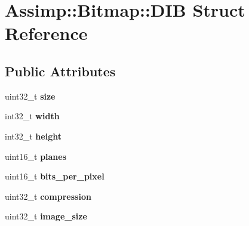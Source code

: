 \hypertarget{struct_assimp_1_1_bitmap_1_1_d_i_b}{\section{Assimp\+:\+:Bitmap\+:\+:D\+I\+B Struct Reference}
\label{struct_assimp_1_1_bitmap_1_1_d_i_b}
}
\subsection*{Public Attributes}
\begin{DoxyCompactItemize}
\item 
\hypertarget{struct_assimp_1_1_bitmap_1_1_d_i_b_a3f900bb044bf5acdb15df11b01d6d1fc}{uint32\+\_\+t {\bfseries size}}\label{struct_assimp_1_1_bitmap_1_1_d_i_b_a3f900bb044bf5acdb15df11b01d6d1fc}

\item 
\hypertarget{struct_assimp_1_1_bitmap_1_1_d_i_b_aaf07cdb2ea0ec2281c658dcf16d11fa1}{int32\+\_\+t {\bfseries width}}\label{struct_assimp_1_1_bitmap_1_1_d_i_b_aaf07cdb2ea0ec2281c658dcf16d11fa1}

\item 
\hypertarget{struct_assimp_1_1_bitmap_1_1_d_i_b_a574c072f98b3b3728ab6d2cd46c9510a}{int32\+\_\+t {\bfseries height}}\label{struct_assimp_1_1_bitmap_1_1_d_i_b_a574c072f98b3b3728ab6d2cd46c9510a}

\item 
\hypertarget{struct_assimp_1_1_bitmap_1_1_d_i_b_a94b97deb6d6cfa4453fd701055fc2c5b}{uint16\+\_\+t {\bfseries planes}}\label{struct_assimp_1_1_bitmap_1_1_d_i_b_a94b97deb6d6cfa4453fd701055fc2c5b}

\item 
\hypertarget{struct_assimp_1_1_bitmap_1_1_d_i_b_afb807e26fa867909098491735d7cbc86}{uint16\+\_\+t {\bfseries bits\+\_\+per\+\_\+pixel}}\label{struct_assimp_1_1_bitmap_1_1_d_i_b_afb807e26fa867909098491735d7cbc86}

\item 
\hypertarget{struct_assimp_1_1_bitmap_1_1_d_i_b_a8f44512e4507b2f2f574f5a75ed752a3}{uint32\+\_\+t {\bfseries compression}}\label{struct_assimp_1_1_bitmap_1_1_d_i_b_a8f44512e4507b2f2f574f5a75ed752a3}

\item 
\hypertarget{struct_assimp_1_1_bitmap_1_1_d_i_b_af7dd8666a096cd433e80b9a3ef6103f7}{uint32\+\_\+t {\bfseries image\+\_\+size}}\label{struct_assimp_1_1_bitmap_1_1_d_i_b_af7dd8666a096cd433e80b9a3ef6103f7}


\end{DoxyCompactItemize}
